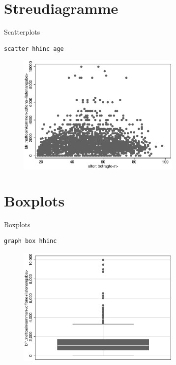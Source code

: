 \section{Streudiagramme}
\begin{frame}[fragile]{Scatterplots}  
\begin{lstlisting}
scatter hhinc age
\end{lstlisting}
\begin{figure}
{\centering\includegraphics[width=8cm]{images/scatter.eps}}
\end{figure}
\end{frame}

\section{Boxplots}
\begin{frame}[fragile]{Boxplots}  
\begin{lstlisting}
graph box hhinc
\end{lstlisting}
\begin{figure}
{\centering\includegraphics[width=8cm]{images/box.eps}}
\end{figure}
\end{frame}


